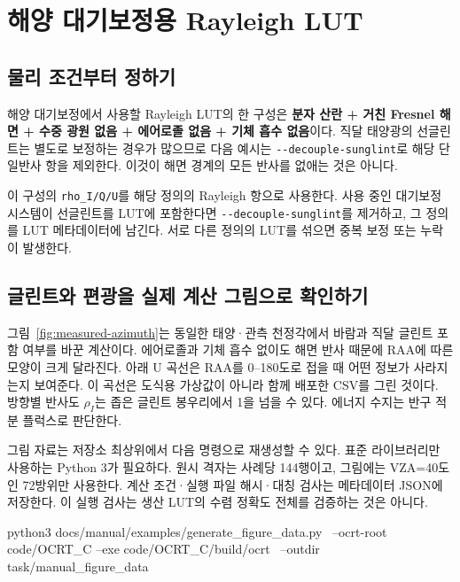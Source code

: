 \section{해양 대기보정용 Rayleigh LUT}
\label{sec:auto:04_examples:3}
\subsection{물리 조건부터 정하기}
\label{sec:auto:04_examples:3.1}
해양 대기보정에서 사용할 Rayleigh LUT의 한 구성은 \textbf{분자 산란 + 거친 Fresnel 해면 + 수중 광원 없음 + 에어로졸 없음 + 기체 흡수 없음}이다. 직달 태양광의 선글린트는 별도로 보정하는 경우가 많으므로 다음 예시는 \texttt{-\allowbreak{}-\allowbreak{}decouple-\allowbreak{}sunglint}로 해당 단일반사 항을 제외한다. 이것이 해면 경계의 모든 반사를 없애는 것은 아니다.

이 구성의 \texttt{rho\_\allowbreak{}I/\allowbreak{}Q/\allowbreak{}U}를 해당 정의의 Rayleigh 항으로 사용한다. 사용 중인 대기보정 시스템이 선글린트를 LUT에 포함한다면 \texttt{-\allowbreak{}-\allowbreak{}decouple-\allowbreak{}sunglint}를 제거하고, 그 정의를 LUT 메타데이터에 남긴다. 서로 다른 정의의 LUT를 섞으면 중복 보정 또는 누락이 발생한다.

\subsection*{글린트와 편광을 실제 계산 그림으로 확인하기}
그림~\ref{fig:measured-azimuth}는 동일한 태양·관측 천정각에서 바람과 직달 글린트 포함 여부를 바꾼 계산이다. 에어로졸과 기체 흡수 없이도 해면 반사 때문에 RAA에 따른 모양이 크게 달라진다. 아래 U 곡선은 RAA를 0--180도로 접을 때 어떤 정보가 사라지는지 보여준다. 이 곡선은 도식용 가상값이 아니라 함께 배포한 CSV를 그린 것이다. 방향별 반사도 $\rho_I$는 좁은 글린트 봉우리에서 1을 넘을 수 있다. 에너지 수지는 반구 적분 플럭스로 판단한다.

\FloatBarrier

그림 자료는 저장소 최상위에서 다음 명령으로 재생성할 수 있다. 표준 라이브러리만 사용하는 Python 3가 필요하다. 원시 격자는 사례당 144행이고, 그림에는 VZA=40도인 72방위만 사용한다. 계산 조건·실행 파일 해시·대칭 검사는 메타데이터 JSON에 저장한다. 이 실행 검사는 생산 LUT의 수렴 정확도 전체를 검증하는 것은 아니다.
\par\noindent\begin{minipage}{\linewidth}
\begin{ManualCode}
python3 docs/manual/examples/generate_figure_data.py \
  --ocrt-root code/OCRT_C --exe code/OCRT_C/build/ocrt \
  --outdir task/manual_figure_data
\end{ManualCode}
\end{minipage}\par

